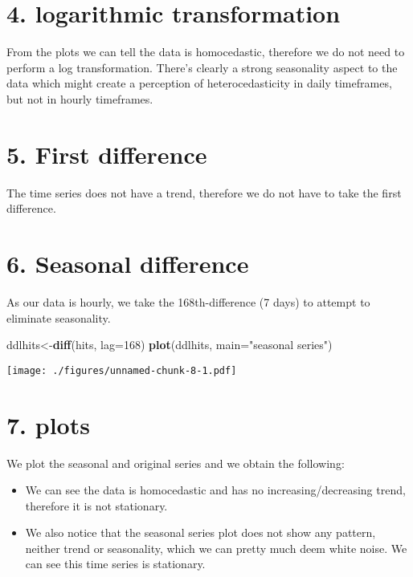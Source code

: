 \documentclass[]{article}
\newenvironment{Shaded}{\begin{snugshade}}{\end{snugshade}}
\newcommand{\DataTypeTok}[1]{\textcolor[rgb]{0.13,0.29,0.53}{#1}}
\newcommand{\DecValTok}[1]{\textcolor[rgb]{0.00,0.00,0.81}{#1}}
\newcommand{\KeywordTok}[1]{\textcolor[rgb]{0.13,0.29,0.53}{\textbf{#1}}}
\newcommand{\NormalTok}[1]{#1}
\newcommand{\StringTok}[1]{\textcolor[rgb]{0.31,0.60,0.02}{#1}}
\begin{document}
\newpage

\hypertarget{logarithmic-transformation}{%
\section{4. logarithmic
transformation}\label{logarithmic-transformation}}

From the plots we can tell the data is homocedastic, therefore we do not
need to perform a log transformation. There's clearly a strong
seasonality aspect to the data which might create a perception of
heterocedasticity in daily timeframes, but not in hourly timeframes.

\hypertarget{first-difference}{%
\section{5. First difference}\label{first-difference}}

The time series does not have a trend, therefore we do not have to take
the first difference.

\hypertarget{seasonal-difference}{%
\section{6. Seasonal difference}\label{seasonal-difference}}

As our data is hourly, we take the 168th-difference (7 days) to attempt
to eliminate seasonality.

\begin{Shaded}
\begin{Highlighting}[]
\NormalTok{ddlhits<-}\KeywordTok{diff}\NormalTok{(hits, }\DataTypeTok{lag=}\DecValTok{168}\NormalTok{)}
\KeywordTok{plot}\NormalTok{(ddlhits, }\DataTypeTok{main=}\StringTok{"seasonal series"}\NormalTok{)}
\end{Highlighting}
\end{Shaded}

\texttt{[image: ./figures/unnamed-chunk-8-1.pdf]}

\newpage

\hypertarget{plots}{%
\section{7. plots}\label{plots}}

We plot the seasonal and original series and we obtain the following:

\begin{itemize}
\item
  We can see the data is homocedastic and has no increasing/decreasing
  trend, therefore it is not stationary.
\item
  We also notice that the seasonal series plot does not show any
  pattern, neither trend or seasonality, which we can pretty much deem
  white noise. We can see this time series is stationary.
\end{itemize}
\end{document}
